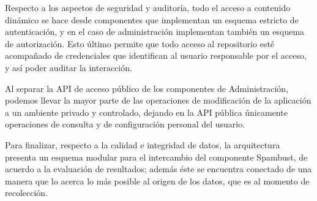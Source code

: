Respecto a los aspectos de seguridad y auditor\'ia, todo el acceso a contenido din\'amico se hace desde componentes que implementan un esquema estricto de autenticaci\'on, y en el caso de administraci\'on implementan tambi\'en un esquema de autorizaci\'on. Esto \'ultimo permite que todo acceso al repositorio est\'e acompa\~nado de credenciales que identifican al usuario responsable por el acceso, y as\'i poder auditar la interacci\'on.

Al separar la API de acceso p\'ublico de los componentes de Administraci\'on, podemos llevar la mayor parte de las operaciones de modificaci\'on de la aplicaci\'on a un ambiente privado y controlado, dejando en la API p\'ublica \'unicamente operaciones de consulta y de configuraci\'on personal del usuario.

Para finalizar, respecto a la calidad e integridad de datos, la arquitectura presenta un esquema modular para el intercambio del componente Spambust, de acuerdo a la evaluaci\'on de resultados; adem\'as \'este se encuentra conectado de una manera que lo acerca lo m\'as posible al origen de los datos, que es al momento de recolecci\'on.
